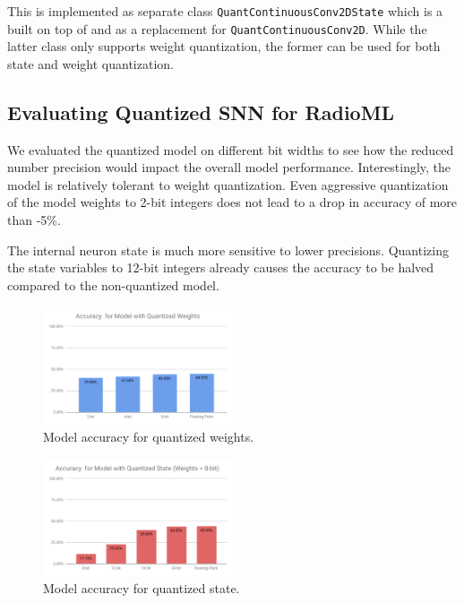 \documentclass[parskip=true, 10pt]{scrartcl}
\begin{document}
This is implemented as separate class \texttt{QuantContinuousConv2DState} which is a built on top of and as a replacement for \texttt{QuantContinuousConv2D}. While the latter class only supports weight quantization, the former can be used for both state and weight quantization.

\subsection{Evaluating Quantized SNN for RadioML}

We evaluated the quantized model on different bit widths to see how the reduced number precision would impact the overall model performance. Interestingly, the model is relatively tolerant to weight quantization. Even aggressive quantization of the model weights to 2-bit integers does not lead to a drop in accuracy of more than -5\%.

The internal neuron state is much more sensitive to lower precisions. Quantizing the state variables to 12-bit integers already causes the accuracy to be halved compared to the non-quantized  model.

\begin{figure}[H]
    \centering
    \includegraphics[width=0.5\textwidth]{quantized_weight.pdf}
    \caption{Model accuracy for quantized weights.}
    \label{fig:quantized_weights_result}
\end{figure}

\begin{figure}[H]
    \centering
    \includegraphics[width=0.5\textwidth]{quantized_state.pdf}
    \caption{Model accuracy for quantized state.}
    \label{fig:quantized_state_result}
\end{figure}
\end{document}

